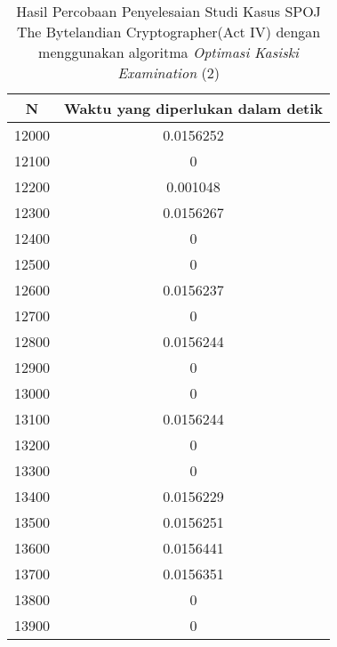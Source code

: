 \begin{table}[H]
\centering
\begin{tabular}{|c|c|}\hline
N&Waktu yang diperlukan dalam detik\\ \hline
12000&0.0156252\\ \hline
12100&0\\ \hline
12200&0.001048\\ \hline
12300&0.0156267\\ \hline
12400&0\\ \hline
12500&0\\ \hline
12600&0.0156237\\ \hline
12700&0\\ \hline
12800&0.0156244\\ \hline
12900&0\\ \hline
13000&0\\ \hline
13100&0.0156244\\ \hline
13200&0\\ \hline
13300&0\\ \hline
13400&0.0156229\\ \hline
13500&0.0156251\\ \hline
13600&0.0156441\\ \hline
13700&0.0156351\\ \hline
13800&0\\ \hline
13900&0\\ \hline
\end{tabular}
\caption {Hasil Percobaan Penyelesaian Studi Kasus SPOJ The Bytelandian Cryptographer(Act IV) dengan menggunakan algoritma \textit{Optimasi Kasiski Examination} (2)}
\label{tab:res4}
\end{table}
